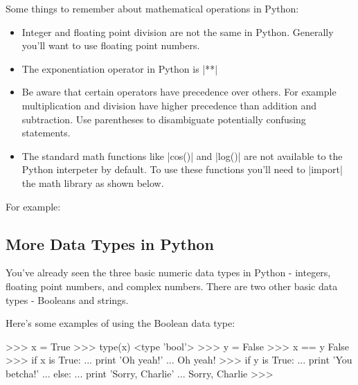 Some things to remember about mathematical operations in Python:
\begin{itemize}
\item
  Integer and floating point division are not the same in Python.
  Generally you'll want to use floating point numbers.
\item
  The exponentiation operator in Python is |**|
\item
  Be aware that certain operators have precedence over others. For
  example multiplication and division have higher precedence than
  addition and subtraction. Use parentheses to disambiguate potentially
  confusing statements.
\item
  The standard math functions like |cos()| and
  |log()| are not available to the Python interpeter by
  default. To use these functions you'll need to |import| the
  math library as shown below.
\end{itemize}

For example:
%



\subsection{More Data Types in Python}

You've already seen the three basic numeric data types in Python -
integers, floating point numbers, and complex numbers. There are two
other basic data types - Booleans and strings.

Here's some examples of using the Boolean data type:
\begin{python}
>>> x = True
>>> type(x)
<type 'bool'>
>>> y = False
>>> x == y
False
>>> if x is True:
...     print 'Oh yeah!'
... 
Oh yeah!
>>> if y is True:
...     print 'You betcha!'
... else:
...     print 'Sorry, Charlie'
... 
Sorry, Charlie
>>>
\end{python}

